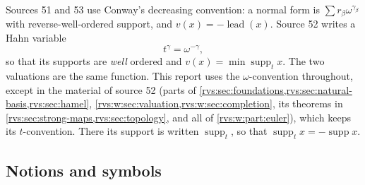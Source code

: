 \documentclass[11pt,letterpaper]{article}
\numberwithin{equation}{section}
\theoremstyle{definition}
\theoremstyle{remark}
\newcommand{\supp}{\operatorname{supp}}
\newcommand{\lead}{\operatorname{lead}}
\begin{document}
Sources 51 and 53 use Conway's decreasing convention: a normal form is
\(\sum r_\beta\omega^{\gamma_\beta}\) with reverse-well-ordered support, and
\(v(x)=-\lead(x)\).  Source 52 writes a Hahn variable
\[
 t^\gamma=\omega^{-\gamma},
\]
so that its supports are \emph{well} ordered and \(v(x)=\min\supp_t x\).
The two valuations are the same function.  This report uses the
\(\omega\)-convention throughout, except in the material of source 52
(parts of \cref{rvs:sec:foundations,rvs:sec:natural-basis,rvs:sec:hamel},
\cref{rvs:w:sec:valuation,rvs:w:sec:completion}, its theorems in
\cref{rvs:sec:strong-maps,rvs:sec:topology}, and all of
\cref{rvs:w:part:euler}), which keeps its \(t\)-convention.  There its
support is written \(\supp_t\), so that \(\supp_t x=-\supp x\).

\subsection{Notions and symbols}\label{rvs:w:subsec:notation}
\end{document}
